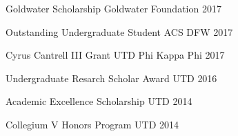 \begin{cvhonors}
\cvhonor
{Goldwater Scholarship} %
{Goldwater Foundation} %
{} %
{2017} %


\cvhonor
{Outstanding Undergraduate Student} %
{ACS DFW} %
{} %
{2017} %


\cvhonor
{Cyrus Cantrell III Grant} %
{UTD Phi Kappa Phi} %
{} %
{2017} %


\cvhonor
{Undergraduate Resarch Scholar Award} %
{UTD} %
{} %
{2016} %


\cvhonor
{Academic Excellence Scholarship} %
{UTD} %
{} %
{2014} %


\cvhonor
{Collegium V Honors Program} %
{UTD} %
{} %
{2014} %

\end{cvhonors}


